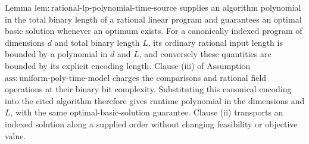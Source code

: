 Lemma
\(\mathrm{lem{:}rational\mbox{-}lp\mbox{-}polynomial\mbox{-}time\mbox{-}source}\)
supplies an algorithm polynomial in the total binary length of a rational
linear program and guarantees an optimal basic solution whenever an optimum
exists.  For a canonically indexed program of dimensions \(d\) and total
binary length \(L\), its ordinary rational input length is bounded by a
polynomial in \(d\) and \(L\), and conversely these quantities are bounded
by its explicit encoding length.  Clause (iii) of Assumption
\(\mathrm{ass{:}uniform\mbox{-}poly\mbox{-}time\mbox{-}model}\) charges
the comparisons and rational field operations at their binary bit
complexity.  Substituting this canonical encoding into the cited algorithm
therefore gives runtime polynomial in the dimensions and \(L\), with the
same optimal-basic-solution guarantee.  Clause (ii) transports an indexed
solution along a supplied order without changing feasibility or objective
value.
